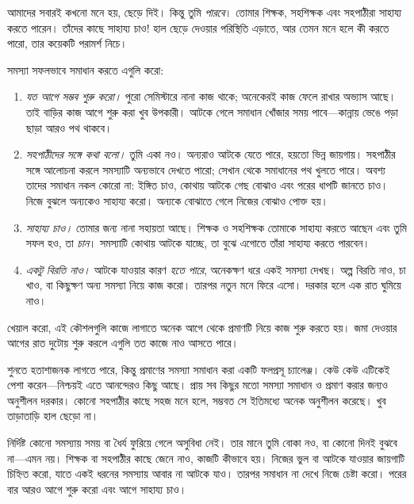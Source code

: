 \documentclass[../../../include/open-logic-section]{subfiles}
\begin{document}


আমাদের সবারই কখনো মনে হয়, ছেড়ে দিই। কিন্তু তুমি
\emph{পারবে}। তোমার শিক্ষক, সহশিক্ষক এবং সহপাঠীরা
সাহায্য করতে পারেন। তাঁদের কাছে সাহায্য চাও!{}
হাল ছেড়ে দেওয়ার পরিস্থিতি এড়াতে, আর তেমন মনে
হলে কী করতে পারো, তার কয়েকটি পরামর্শ নিচে।

সমস্যা সফলভাবে সমাধান করতে এগুলি করো:
\begin{enumerate}
\item \emph{যত আগে সম্ভব শুরু করো।} পুরো সেমিস্টারে
  নানা কাজ থাকে; অনেকেরই কাজ ফেলে রাখার অভ্যাস
  আছে। তাই বাড়ির কাজ আগে শুরু করা খুব উপকারী।
  আটকে গেলে সমাধান খোঁজার সময় পাবে—কান্নায়
  ভেঙে পড়া ছাড়া আরও পথ থাকবে।
\item \emph{সহপাঠীদের সঙ্গে কথা বলো।} তুমি একা নও।
  অন্যরাও আটকে যেতে পারে, হয়তো ভিন্ন জায়গায়।
  সহপাঠীর সঙ্গে আলোচনা করলে সমস্যাটি অন্যভাবে
  দেখতে পারো; সেখান থেকে সমাধানের পথ খুলতে পারে।
  অবশ্য তাদের সমাধান নকল কোরো না: ইঙ্গিত চাও,
  কোথায় আটকে গেছ বোঝাও এবং পরের ধাপটি জানতে
  চাও। নিজে বুঝলে অন্যকেও সাহায্য করো। অন্যকে
  বোঝাতে গেলে নিজের বোঝাও পোক্ত হয়।
\item \emph{সাহায্য চাও।} তোমার জন্য নানা সহায়তা
  আছে। শিক্ষক ও সহশিক্ষক তোমাকে সাহায্য করতে
  আছেন এবং তুমি সফল হও, তা \emph{চান}। সমস্যাটি
  কোথায় আটকে যাচ্ছে, তা বুঝে এগোতে তাঁরা
  সাহায্য করতে পারবেন।
\item \emph{একটু বিরতি নাও।} আটকে যাওয়ার কারণ
  \emph{হতে পারে}, অনেকক্ষণ ধরে একই সমস্যা
  দেখছ। অল্প বিরতি নাও, চা খাও, বা কিছুক্ষণ
  অন্য সমস্যা নিয়ে কাজ করো। তারপর নতুন মনে
  ফিরে এসো। দরকার হলে এক রাত ঘুমিয়ে নাও।
\end{enumerate}

খেয়াল করো, এই কৌশলগুলি কাজে লাগাতে অনেক আগে
থেকে প্রমাণটি নিয়ে কাজ শুরু করতে হয়। জমা দেওয়ার
আগের রাত দুটোয় শুরু করলে এগুলি তত কাজে নাও
আসতে পারে।

শুনতে হতাশাজনক লাগতে পারে, কিন্তু প্রমাণের সমস্যা
সমাধান করা একটি ফলপ্রসূ চ্যালেঞ্জ। কেউ কেউ
এটিকেই পেশা করেন—নিশ্চয়ই এতে আনন্দেরও কিছু
আছে। প্রায় সব কিছুর মতো সমস্যা সমাধান ও প্রমাণ
করার জন্যও অনুশীলন দরকার। কোনো সহপাঠীর কাছে
সহজ মনে হলে, সম্ভবত সে ইতিমধ্যে অনেক অনুশীলন
করেছে। খুব তাড়াতাড়ি হাল ছেড়ো না।

নির্দিষ্ট কোনো সমস্যায় সময় বা ধৈর্য ফুরিয়ে গেলে
অসুবিধা নেই। তার মানে তুমি বোকা নও, বা কোনো
দিনই বুঝবে না—এমন নয়। শিক্ষক বা সহপাঠীর কাছে
জেনে নাও, কাজটি কীভাবে হয়। নিজের ভুল বা আটকে
যাওয়ার জায়গাটি চিহ্নিত করো, যাতে একই ধরনের
সমস্যায় আবার না আটকে যাও। তারপর সমাধান না
দেখে নিজে চেষ্টা করো। পরের বার আরও আগে
শুরু করো এবং আগে সাহায্য চাও।
\end{document}
